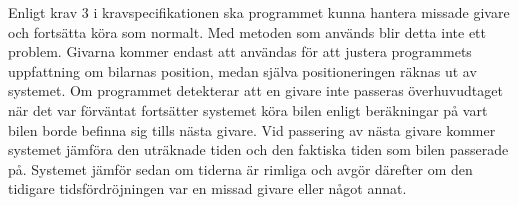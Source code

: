 Enligt krav 3 i kravspecifikationen ska programmet kunna hantera missade givare
och fortsätta köra som normalt. Med metoden som används blir detta inte ett
problem. Givarna kommer endast att användas för att justera programmets
uppfattning om bilarnas position, medan själva positioneringen räknas ut av
systemet. Om programmet detekterar att en givare inte passeras överhuvudtaget
när det var förväntat fortsätter systemet köra bilen enligt beräkningar på vart
bilen borde befinna sig tills nästa givare. Vid passering av nästa givare
kommer systemet jämföra den uträknade tiden och den faktiska tiden som bilen
passerade på. Systemet jämför sedan om tiderna är rimliga och avgör därefter om
den tidigare tidsfördröjningen var en missad givare eller något annat.

